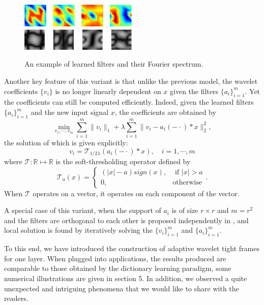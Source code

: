 \documentclass[a4paper]{article}
\begin{document}
\begin{figure}[h!]
    \centering
    \includegraphics[width=0.5\textwidth]{fig11.eps}
  \includegraphics[width=0.5\textwidth]{fig12.eps}
    \caption{An example of learned filters and their Fourier spectrum.}
    \label{fig:1}
\end{figure}
Another key feature of this variant  is that unlike the previous model, the wavelet coefficients $\{v_i\}$ is no longer linearly dependent on $x$ given the filters $\{a_i\}_{i=1}^m$. Yet the coefficients can still be computed efficiently. Indeed, given the learned filters $\{a_i\}_{i=1}^m$ and the new input signal $x$, the coefficients are obtained by 
\[
\min_{v_1,\cdots,v_m} \sum_{i=1}^m \|v_i\|_1 + \lambda \sum_{i=1}^m \|v_i - a_i(-\cdot)*x\|_2^2,
\]
the solution of which is given explicitly:
\[
v_i = \mathcal{T}_{1/2\lambda}( a_i(-\cdot)*x),\quad i=1,\cdots,m
\]
where $\mathcal{T}: \mathbb{R}\mapsto \mathbb{R}$ is the soft-thresholding operator defined by
\[
\mathcal{T}_a(x)=\left\{ \begin{array}{lr}  (|x|-a)sign(x), &\textrm{ if } |x| > a \\0, &\textrm{otherwise}\end{array}\right . .
\]
When $\mathcal{T}$ operates on a vector, it operates on each component of the vector.


A special case of this variant, when the support of $a_i$ is of size $r\times r$ and $m=r^2$ and the filters are orthogonal to each other is proposed independently in \cite{cai2014data}, and local solution is found by iteratively solving the $\{v_i\}_{i=1}^m$ and $\{a_i\}_{i=1}^m$.

To this end, we have introduced the construction of adaptive wavelet tight frames for one layer. When plugged into applications, the results produced are comparable to those obtained by the dictionary learning paradigm, some numerical illustrations are given in section 5. In addition, we observed a quite unexpected and intriguing phenomena that we would like to share with the readers.
\end{document}
